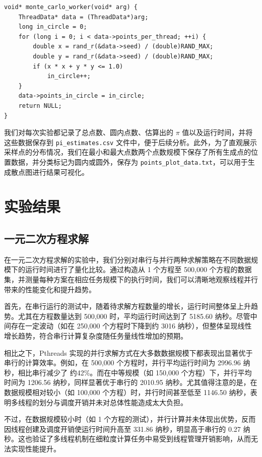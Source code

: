 \documentclass[a4paper, utf8]{ctexart}
\begin{document}
	\begin{verbatim}
void* monte_carlo_worker(void* arg) {
    ThreadData* data = (ThreadData*)arg;
    long in_circle = 0;
    for (long i = 0; i < data->points_per_thread; ++i) {
        double x = rand_r(&data->seed) / (double)RAND_MAX;
        double y = rand_r(&data->seed) / (double)RAND_MAX;
        if (x * x + y * y <= 1.0)
            in_circle++;
    }
    data->points_in_circle = in_circle;
    return NULL;
}
	\end{verbatim}
	
	我们对每次实验都记录了总点数、圆内点数、估算出的 $\pi$ 值以及运行时间，并将这些数据保存到 \verb|pi_estimates.csv| 文件中，便于后续分析。此外，为了直观展示采样点的分布情况，我们在最小和最大点数两个点数规模下保存了所有生成点的位置数据，并分类标记为圆内或圆外，保存为 \verb|points_plot_data.txt|，可以用于生成散点图进行结果可视化。
	
	\section{实验结果}
	
	\subsection{一元二次方程求解}
	
	在一元二次方程求解的实验中，我们分别对串行与并行两种求解策略在不同数据规模下的运行时间进行了量化比较。通过构造从 1 个方程至 500,000 个方程的数据集，并测量每种方案在相应任务规模下的执行时间，我们可以清晰地观察线程并行带来的性能变化和提升趋势。
	
	首先，在串行运行的测试中，随着待求解方程数量的增长，运行时间整体呈上升趋势。尤其在方程数量达到 500,000 时，平均运行时间达到了 5185.60 纳秒。尽管中间存在一定波动（如在 250,000 个方程时下降到约 3016 纳秒），但整体呈现线性增长趋势，符合串行计算复杂度随任务量线性增加的预期。
	
	相比之下，Pthreads 实现的并行求解方式在大多数数据规模下都表现出显著优于串行的计算效率。例如，在 500,000 个方程时，并行平均运行时间为 2996.96 纳秒，相比串行减少了 约42\%。而在中等规模（如 150,000 个方程）下，并行平均时间为 1206.56 纳秒，同样显著优于串行的 2010.95 纳秒。尤其值得注意的是，在数据规模相对较小（如 100,000 个方程）时，并行时间甚至低至 1146.50 纳秒，表明多线程的划分与调度开销并未对总体性能造成太大负担。
	
	不过，在数据规模较小时（如 1 个方程的测试），并行计算并未体现出优势，反而因线程创建及调度开销使运行时间升高至 331.86 纳秒，明显高于串行的 0.27 纳秒。这也验证了多线程机制在细粒度计算任务中易受到线程管理开销影响，从而无法实现性能提升。
	
\end{document}
